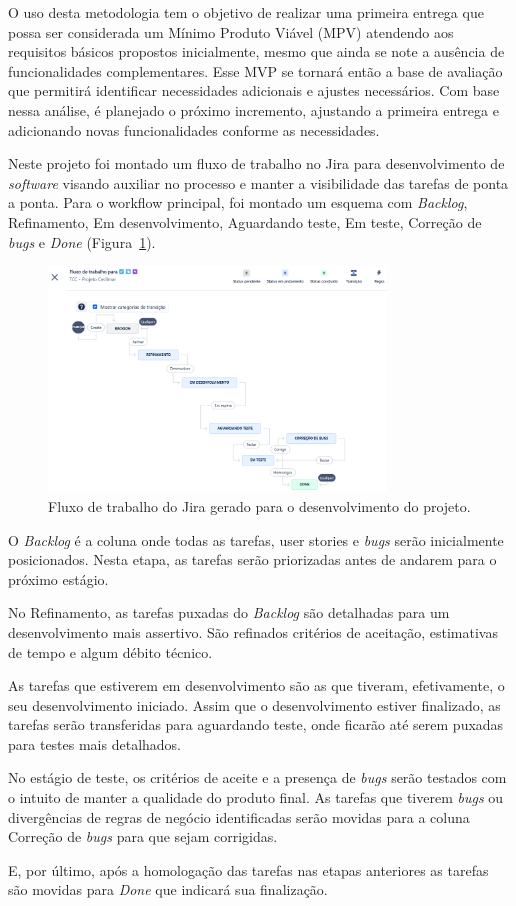 O uso desta metodologia tem o objetivo de realizar uma primeira entrega que possa ser considerada um Mínimo Produto Viável (MPV) atendendo aos requisitos básicos propostos inicialmente, mesmo que ainda se note a ausência de funcionalidades complementares. Esse MVP se tornará então a base de avaliação que permitirá identificar necessidades adicionais e ajustes necessários. Com base nessa análise, é planejado o próximo incremento, ajustando a primeira entrega e adicionando novas funcionalidades conforme as necessidades.

Neste projeto foi montado um fluxo de trabalho no Jira para desenvolvimento de \textit{software} visando auxiliar no processo e manter a visibilidade das tarefas de ponta a ponta. Para o workflow principal, foi montado um esquema com \textit{Backlog}, Refinamento, Em desenvolvimento, Aguardando teste, Em teste, Correção de \textit{bugs} e \textit{Done} (Figura~\ref{fig:fluxoJira}).

\begin{figure}[htb]
    \centering
    \includegraphics[width=0.8\textwidth]{imagens/fluxoJira.png}
    \caption{Fluxo de trabalho do Jira gerado para o desenvolvimento do projeto.}
    \label{fig:fluxoJira}
\end{figure} 

O \textit{Backlog} é a coluna onde todas as tarefas, user stories e \textit{bugs} serão inicialmente posicionados. Nesta etapa, as tarefas serão priorizadas antes de andarem para o próximo estágio.

No Refinamento, as tarefas puxadas do \textit{Backlog} são detalhadas para um desenvolvimento mais assertivo. São refinados critérios de aceitação, estimativas de tempo e algum débito técnico.

As tarefas que estiverem em desenvolvimento são as que tiveram, efetivamente, o seu desenvolvimento iniciado. Assim que o desenvolvimento estiver finalizado, as tarefas serão transferidas para aguardando teste, onde ficarão até serem puxadas para testes mais detalhados.

No estágio de teste, os critérios de aceite e a presença de \textit{bugs} serão testados com o intuito de manter a qualidade do produto final. As tarefas que tiverem \textit{bugs} ou divergências de regras de negócio identificadas serão movidas para a coluna Correção de \textit{bugs} para que sejam corrigidas.

E, por último, após a homologação das tarefas nas etapas anteriores as tarefas são movidas para \textit{Done} que indicará sua finalização.
